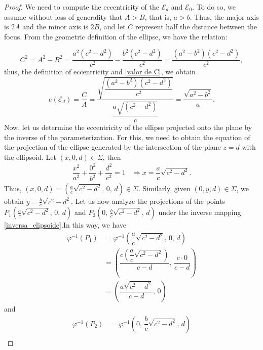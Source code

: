 \documentclass{amsart}
\theoremstyle{plain}
\numberwithin{equation}{section}
\begin{document}
\begin{proof}
	
	We need to compute the eccentricity of the $\mathcal{E}_d $ and $ \mathcal{E}_0$. To do so, we assume without loss of generality that $A > B$, that is, $a > b$. Thus, the major axis is $2A$ and the minor axis is $2B$, and let $C$ represent half the distance between the focus. From the geometric definition of the ellipse, we have the relation:
	
	\begin{equation}\label{valor de C}
		C^2 = A^2 - B^2 = \dfrac{a^2(c^2 - d^2)}{c^2} - \dfrac{b^2(c^2 - d^2)}{c^2} = \dfrac{(a^2 - b^2)(c^2 - d^2)}{c^2},
	\end{equation}
	thus, the definition of eccentricity and \eqref{valor de C}, we obtain
	\begin{equation}\label{exec E_d}
		e(\mathcal{E}_d) = \dfrac{C}{A} = \dfrac{ \sqrt{\dfrac{(a^2 - b^2)(c^2 - d^2)}{c^2}} }{\dfrac{a\sqrt{(c^2-d^2)}}{c}} = \dfrac{\sqrt{a^2 - b^2}}{a}.
	\end{equation}
	Now, let us determine the eccentricity of the ellipse projected onto the plane by the inverse of the parameterization. For this, we need to obtain the equation of the projection of the ellipse generated by the intersection of the plane \( z = d \) with the ellipsoid.
	Let \( (x, 0, d) \in \Sigma \), then
	$$
	\begin{aligned}
		\dfrac{x^2}{a^2} + \dfrac{0^2}{b^2} + \dfrac{d^2}{c^2} = 1
		& \Longrightarrow  x = \dfrac{a}{c} \sqrt{c^2 - d^2}. 
	\end{aligned}
	$$
	Thus, \( (x, 0, d) = \left( \frac{a}{c} \sqrt{c^2 - d^2},\, 0,\, d \right) \in \Sigma \). Similarly, given \( (0, y, d) \in \Sigma \), we obtain \( y = \frac{b}{c} \sqrt{c^2 - d^2} \). Let us now analyze the projections of the points \( P_1\left( \frac{a}{c} \sqrt{c^2 - d^2},\, 0,\, d \right) \) and \( P_2\left( 0,\, \frac{b}{c} \sqrt{c^2 - d^2},\, d \right) \) under the inverse mapping \eqref{inversa_elipsoide}.In this way, we have
	\begin{align*}
		\varphi^{-1}(P_1)&= \varphi^{-1}\left( \dfrac{a}{c} \sqrt{c^2 - d^2},\, 0,\, d \right)\\
		&= \left( \dfrac{c \left( \dfrac{a}{c} \sqrt{c^2 - d^2} \right)}{c - d},\, \dfrac{c \cdot 0}{c - d} \right)\\
		&= \left( \dfrac{a \sqrt{c^2 - d^2}}{c - d},\, 0 \right)
	\end{align*}
	and
	\begin{align*}
		\varphi^{-1}(P_2)&= \varphi^{-1}\left( 0,\, \dfrac{b}{c} \sqrt{c^2 - d^2},\, d \right)\\

\end{align*}
\end{proof}
\end{document}
